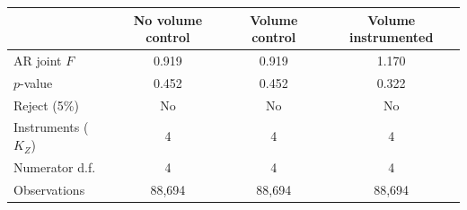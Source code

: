 \begin{tabular}{@{}lccc@{}}
\toprule
& No volume control & Volume control & Volume instrumented \\
\midrule
AR joint $F$ & 0.919 & 0.919 & 1.170 \\
$p$-value & 0.452 & 0.452 & 0.322 \\
Reject (5\%) & No & No & No \\
\midrule
Instruments ($K_Z$) & 4 & 4 & 4 \\
Numerator d.f. & 4 & 4 & 4 \\
Observations & 88,694 & 88,694 & 88,694 \\
\bottomrule
\end{tabular}

